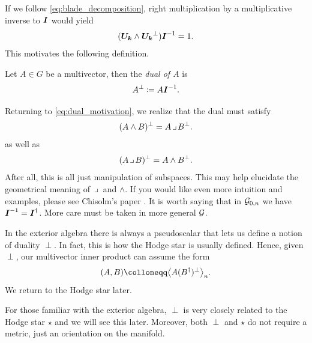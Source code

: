\documentclass{article}
\begin{document}
If we follow \cref{eq:blade_decomposition}, right multiplication by a multiplicative inverse to $\boldsymbol{I}$ would yield
\begin{equation}
\label{eq:dual_motivation}
    (\boldsymbol{U_k}\wedge \boldsymbol{U_k}^\perp)\boldsymbol{I}^{-1} = 1.
\end{equation}
This motivates the following definition.

\begin{definition}
Let $A \in G$ be a multivector, then the \emph{dual of $A$} is
\begin{equation}
\label{eq:dual}
A^\perp \coloneqq A\boldsymbol{I}^{-1}.
\end{equation}
\end{definition}

Returning to \cref{eq:dual_motivation}, we realize that the dual must satisfy
\begin{equation}
(A\wedge B)^\perp = A\hspace*{.5mm}\lrcorner \hspace*{.5mm} B^\perp.
\end{equation}
as well as
\begin{equation}
(A\hspace*{.5mm}\lrcorner \hspace*{.5mm} B)^\perp = A\wedge B^\perp.
\end{equation}
After all, this is all just manipulation of subspaces. This may help elucidate the geometrical meaning of $\hspace*{.5mm}\lrcorner \hspace*{.5mm}$ and $\wedge$. If you would like even more intuition and examples, please see Chisolm's paper \cite{chisolm_geometric_2012}. It is worth saying that in $\mathcal{G}_{0,n}$ we have $\boldsymbol{I}^{-1}=\boldsymbol{I}^\dagger$. More care must be taken in more general $\mathcal{G}$. 
\begin{remark}
In the exterior algebra there is always a pseudoscalar that lets us define a notion of duality $\perp$. In fact, this is how the Hodge star is usually defined. Hence, given $\perp$, our multivector inner product can assume the form
\begin{equation}
    (A,B)\colloneqq \proj{n}{A(B^\dagger)^\perp}.
\end{equation}
We return to the Hodge star later.
\end{remark}

\begin{remark}
For those familiar with the exterior algebra, $\perp$ is very closely related to the Hodge star $\star$ and we will see this later. Moreover, both $\perp$ and $\star$ do not require a metric, just an orientation on the manifold.
\end{remark}
\end{document}
